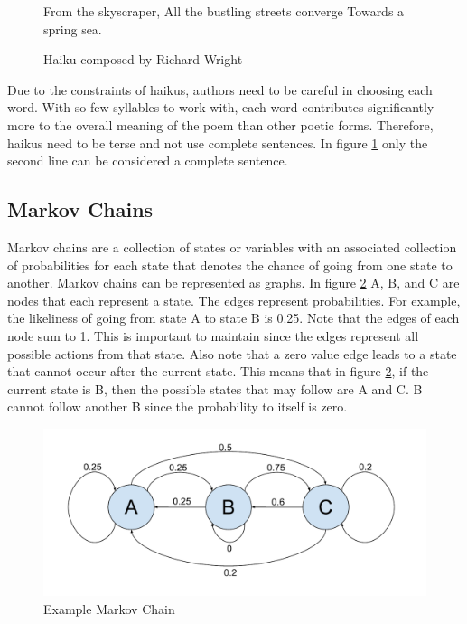 \documentclass[]{article}
\begin{document}
\begin{figure}[H]
	\centering
	From the skyscraper, \break
	All the bustling streets converge \break
	Towards a spring sea.
	\caption{Haiku composed by Richard Wright \cite{Terebess}}
	\label{fig:WrightHaiku}
\end{figure}

Due to the constraints of haikus, authors need to be careful in choosing each word. With so few syllables to work with, each word contributes significantly more to the overall meaning of the poem than other poetic forms. Therefore, haikus need to be terse and not use complete sentences. In figure \ref{fig:WrightHaiku} only the second line can be considered a complete sentence.

\subsection{Markov Chains}

Markov chains are a collection of states or variables with an associated collection of probabilities for each state that denotes the chance of going from one state to another\cite{Markov}. Markov chains can be represented as graphs. In figure \ref{fig:Chain} A, B, and C are nodes that each represent a state. The edges represent probabilities. For example, the likeliness of going from state A to state B is 0.25. Note that the edges of each node sum to 1. This is important to maintain since the edges represent all possible actions from that state. Also note that a zero value edge leads to a state that cannot occur after the current state. This means that in figure \ref{fig:Chain}, if the current state is B, then the possible states that may follow are A and C. B cannot follow another B since the probability to itself is zero. 

\begin{figure}[H]
	\centering
	\includegraphics[width=1\textwidth]{MarkovChainExample}
	\caption{Example Markov Chain}
	\label{fig:Chain}
\end{figure}
\end{document}
